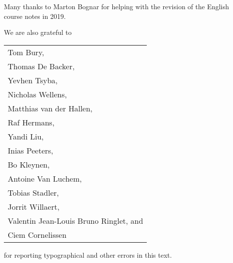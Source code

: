 Many thanks to Marton Bognar for helping with the revision of the 
English course notes in 2019.

We are also grateful to 
\begin{center}
\begin{tabular}{l}
Tom Bury,  \\
Thomas De Backer,  \\
Yevhen Tsyba, \\
Nicholas Wellens, \\
Matthias van der Hallen, \\
Raf Hermans, \\
Yandi Liu, \\
Inias Peeters, \\
Bo Kleynen, \\
Antoine Van Luchem, \\
Tobias Stadler, \\
Jorrit Willaert, \\
Valentin Jean-Louis Bruno Ringlet, and \\
Ciem Cornelissen
\end{tabular}
\end{center}
for reporting typographical and other errors in this text.

